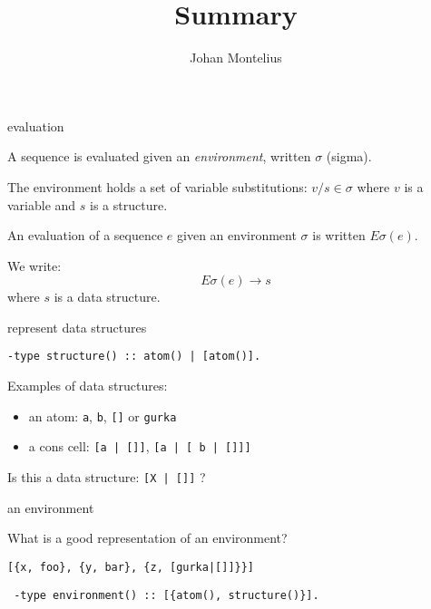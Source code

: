 

\title[ID1019 Summary]{Summary}


\author{Johan Montelius}
\date{\semester}



\begin{frame}
\titlepage
\end{frame}

\begin{frame}{evaluation}

A sequence is evaluated given an {\em environment}, written $\sigma$ (sigma).

\pause\vspace{20pt}
The environment holds a set of variable substitutions:
$v/s \in \sigma$ where $v$ is a variable and $s$ is a structure.

\pause\vspace{20pt} 
An evaluation of a sequence $e$ given an environment
$\sigma$ is written $E\sigma(e)$. 

\pause\vspace{20pt}
We write:
\vspace{20pt}
$$E\sigma(e) \rightarrow s$$
\vspace{20pt}
where $s$ is a data structure.

\end{frame}

\begin{frame}[fragile]{represent data structures}

\begin{verbatim}
-type structure() :: atom() | [atom()].
\end{verbatim}
\pause\vspace{20pt}

Examples of data structures:
\pause\vspace{20pt}
\begin{itemize}
\item an atom: {\tt a}, {\tt b}, {\tt []} or {\tt gurka}
\item a cons cell: {\tt [a | []]}, {\tt [a | [ b | []]]}
\end{itemize}

\pause\vspace{20pt}
Is this a data structure: {\tt [X | []]} ?

\end{frame}

\begin{frame}[fragile]{an environment}

\pause\vspace{20pt}
What is a good representation of an environment?

\pause\vspace{20pt}
\verb+[{x, foo}, {y, bar}, {z, [gurka|[]]}}]+

\pause\vspace{20pt}
\verb+ -type environment() :: [{atom(), structure()}]. +

\end{frame}

